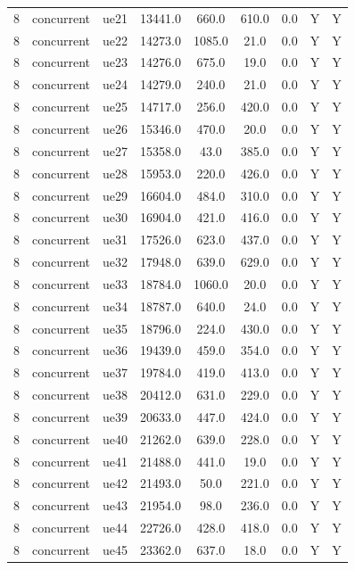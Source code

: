 \begin{table}[ht]
\begin{tabular}{|c|c|c|c|c|c|c|c|c|}
8 & concurrent & ue21 & 13441.0 & 660.0 & 610.0 & 0.0 & Y & Y \\
8 & concurrent & ue22 & 14273.0 & 1085.0 & 21.0 & 0.0 & Y & Y \\
8 & concurrent & ue23 & 14276.0 & 675.0 & 19.0 & 0.0 & Y & Y \\
8 & concurrent & ue24 & 14279.0 & 240.0 & 21.0 & 0.0 & Y & Y \\
8 & concurrent & ue25 & 14717.0 & 256.0 & 420.0 & 0.0 & Y & Y \\
8 & concurrent & ue26 & 15346.0 & 470.0 & 20.0 & 0.0 & Y & Y \\
8 & concurrent & ue27 & 15358.0 & 43.0 & 385.0 & 0.0 & Y & Y \\
8 & concurrent & ue28 & 15953.0 & 220.0 & 426.0 & 0.0 & Y & Y \\
8 & concurrent & ue29 & 16604.0 & 484.0 & 310.0 & 0.0 & Y & Y \\
8 & concurrent & ue30 & 16904.0 & 421.0 & 416.0 & 0.0 & Y & Y \\
8 & concurrent & ue31 & 17526.0 & 623.0 & 437.0 & 0.0 & Y & Y \\
8 & concurrent & ue32 & 17948.0 & 639.0 & 629.0 & 0.0 & Y & Y \\
8 & concurrent & ue33 & 18784.0 & 1060.0 & 20.0 & 0.0 & Y & Y \\
8 & concurrent & ue34 & 18787.0 & 640.0 & 24.0 & 0.0 & Y & Y \\
8 & concurrent & ue35 & 18796.0 & 224.0 & 430.0 & 0.0 & Y & Y \\
8 & concurrent & ue36 & 19439.0 & 459.0 & 354.0 & 0.0 & Y & Y \\
8 & concurrent & ue37 & 19784.0 & 419.0 & 413.0 & 0.0 & Y & Y \\
8 & concurrent & ue38 & 20412.0 & 631.0 & 229.0 & 0.0 & Y & Y \\
8 & concurrent & ue39 & 20633.0 & 447.0 & 424.0 & 0.0 & Y & Y \\
8 & concurrent & ue40 & 21262.0 & 639.0 & 228.0 & 0.0 & Y & Y \\
8 & concurrent & ue41 & 21488.0 & 441.0 & 19.0 & 0.0 & Y & Y \\
8 & concurrent & ue42 & 21493.0 & 50.0 & 221.0 & 0.0 & Y & Y \\
8 & concurrent & ue43 & 21954.0 & 98.0 & 236.0 & 0.0 & Y & Y \\
8 & concurrent & ue44 & 22726.0 & 428.0 & 418.0 & 0.0 & Y & Y \\
8 & concurrent & ue45 & 23362.0 & 637.0 & 18.0 & 0.0 & Y & Y \\

\end{tabular}
\end{table}
